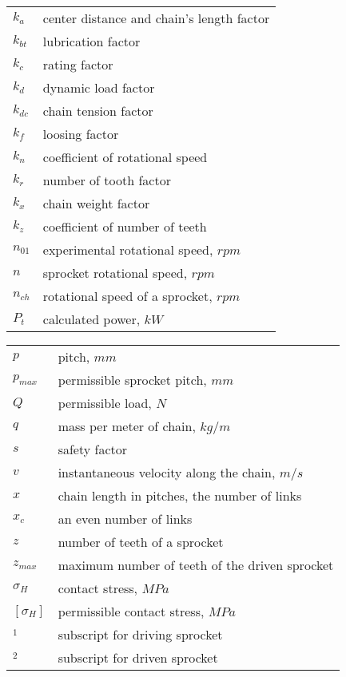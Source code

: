 \begin{tabular}[t]{lp{6.5cm}}
	$ k_a $ & center distance and chain's length factor\\
	$ k_{bt} $ & lubrication factor\\
	$ k_c $ & rating factor\\
	$ k_d $ & dynamic load factor\\
	$ k_{dc} $ & chain tension  factor\\
	$ k_f $ & loosing factor\\
	$ k_n $ & coefficient of rotational speed\\
	$ k_r $ & number of tooth factor\\
	$ k_x $ & chain weight factor\\
	$ k_z $ & coefficient of number of teeth\\
	$ n_{01} $ & experimental rotational speed, $ \unit{rpm} $\\
	$ n $ & sprocket rotational speed, $ \unit{rpm} $\\
	$ n_{ch} $ & rotational speed of a sprocket, $ \unit{rpm} $\\
	$ P_t $ & calculated power, $ \unit{kW} $\\
\end{tabular}
\begin{tabular}[t]{lp{6.5cm}}
	$ p $ & pitch, $ \unit{mm} $\\
	$ p_{max} $ & permissible sprocket pitch, $ \unit{mm} $\\
	$ Q $ & permissible load, $ \unit{N} $\\
	$ q $ & mass per meter of chain, $ \unit{kg/m} $\\
	$ s $ & safety factor\\
	$ v $ & instantaneous velocity along the chain, $ \unit{m/s} $\\
	$ x $ & chain length in pitches, the number of links\\
	$ x_c $ & an even number of links\\
	$ z $ & number of teeth of a sprocket\\
	$ z_{max} $ & maximum number of teeth of the driven sprocket\\
	$ \sigma_H $ & contact stress, $ \unit{MPa} $\\
	$ [\sigma_H] $ & permissible contact stress, $ \unit{MPa} $\\
	$ _1 $  & subscript for driving sprocket\\
	$ _2 $  & subscript for driven sprocket
\end{tabular}

